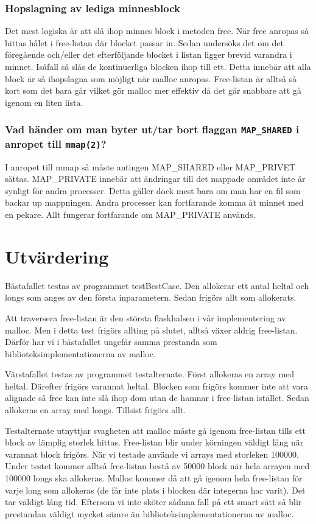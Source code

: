 \documentclass[a4paper]{article}
\begin{document}

\subsubsection*{Hopslagning av lediga minnesblock }
Det mest logiska är att slå ihop minnes block i metoden free. När free anropas så hittas hålet i free-listan där blocket passar in. Sedan undersöks det om det föregående och/eller det efterföljande blocket i listan ligger brevid varandra i minnet. Isåfall så slås de kontinuerliga blocken ihop till ett. Detta innebär att alla block är så ihopslagna som möjligt när malloc anropas. Free-listan är alltså så kort som det bara går vilket gör malloc mer effektiv då det går snabbare att gå igenom en liten lista.

\subsubsection*{Vad händer om man byter ut/tar bort flaggan \texttt{MAP\_SHARED} i anropet till \texttt{mmap(2)}?} %
I anropet till mmap så måste antingen MAP_SHARED eller MAP_PRIVET sättas. MAP_PRIVATE innebär att ändringar till det mappade området inte är synligt för andra processer. Detta gäller dock mest bara om man har en fil som backar up mappningen. Andra processer kan fortfarande komma åt minnet med en pekare. Allt fungerar fortfarande om MAP_PRIVATE används.

\section*{Utvärdering}
Bästafallet testas av programmet testBestCase. Den allokerar ett antal heltal och longs som anges av den första inparametern. Sedan frigörs allt som allokerats. 

Att traversera free-listan är den största flaskhalsen i vår implementering av malloc. Men i detta test frigörs allting på slutet, alltså växer aldrig free-listan. Därför har vi i bästafallet ungefär samma prestanda som biblioteksimplementationerna av malloc.

Värstafallet testas av programmet testalternate. Först allokeras en array med heltal. Därefter frigörs varannat heltal. Blocken som frigörs kommer inte att vara alignade så free kan inte slå ihop dom utan de hamnar i free-listan istället. Sedan allokeras en array med longs. Tillsist frigörs allt.

Testalternate utnyttjar svagheten att malloc måste gå igenom free-listan tills ett block av lämplig storlek hittas. Free-listan blir under körningen väldigt lång när varannat block frigörs. När vi testade använde vi arrays med storleken 100000. Under testet kommer alltså free-listan bestå av 50000 block när hela arrayen med 100000 longs ska allokeras. Malloc kommer då att gå igenom hela free-listan för varje long som allokeras (de får inte plats i blocken där integerna har varit). Det tar väldigt lång tid. Eftersom vi inte sköter sådana fall på ett smart sätt så blir prestandan väldigt mycket sämre än biblioteksimplementationerna av malloc. 
\end{document}
